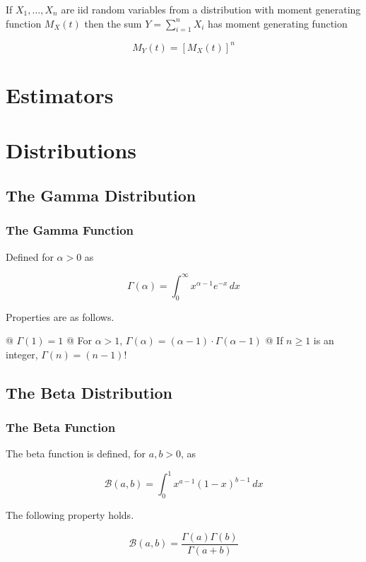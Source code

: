     If $X_1, \ldots, X_n$ are iid random variables from a distribution with moment generating function
    $M_X(t)$ then the sum $Y = \sum_{i=1}^n X_i$ has moment generating function

    \[
        M_Y(t) = {[M_X(t)]}^n
    \]

\section{Estimators}

\section{Distributions}
    \subsection{The Gamma Distribution}

        \subsubsection{The Gamma Function}
        Defined for $\alpha > 0$ as

        \[
            \Gamma(\alpha) = \int_0^\infty x^{\alpha - 1} e^{-x} \, dx
        \]

        Properties are as follows.

        \begin{easylist}[enumerate]
            @ $\Gamma(1) = 1$
            @ For $\alpha > 1$, $\Gamma(\alpha) = (\alpha - 1)\cdot \Gamma(\alpha - 1)$
            @ If $n \ge 1$ is an integer, $\Gamma(n) = (n - 1)!$
        \end{easylist}

    \subsection{The Beta Distribution}
        \subsubsection{The Beta Function}
        The beta function is defined, for $a, b > 0$, as

        \[
            \mathcal{B}(a, b) = \int_0^1 x^{a - 1} {(1 - x)}^{b - 1} \, dx
        \]

        The following property holds.

        \[
            \mathcal{B}(a, b) = \frac{\Gamma(a) \Gamma(b)}{\Gamma(a + b)}
        \]
